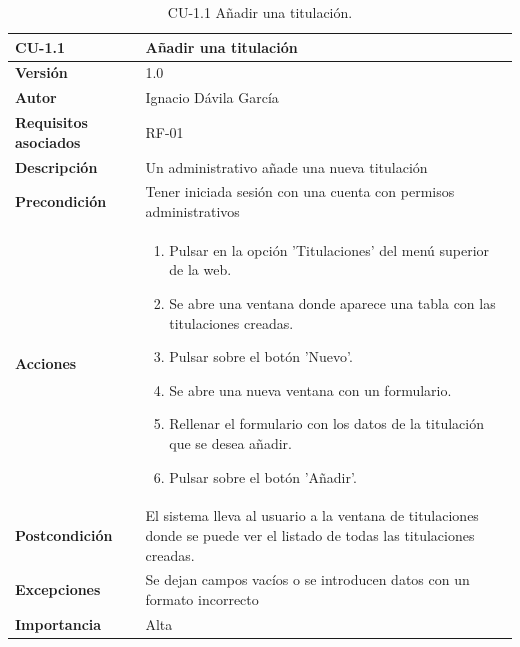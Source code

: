 \begin{table}[p]
	\centering
	\begin{tabularx}{\linewidth}{ p{} p{} }
		\toprule
		\textbf{CU-1.1}    & \textbf{Añadir una titulación}\\
		\toprule
		\textbf{Versión}              & 1.0    \\
		\textbf{Autor}                & Ignacio Dávila García \\
		\textbf{Requisitos asociados} & RF-01 \\
		\textbf{Descripción}          & Un administrativo añade una nueva titulación \\
		\textbf{Precondición}         & Tener iniciada sesión con una cuenta con permisos administrativos \\
		\textbf{Acciones}             &
		\begin{enumerate}
			\def\labelenumi{\arabic{enumi}.}
			\tightlist
			\item Pulsar en la opción 'Titulaciones' del menú superior de la web.
			\item Se abre una ventana donde aparece una tabla con las titulaciones creadas.
			\item Pulsar sobre el botón 'Nuevo'.
			\item Se abre una nueva ventana con un formulario.
			\item Rellenar el formulario con los datos de la titulación que se desea añadir.
			\item Pulsar sobre el botón 'Añadir'.
		\end{enumerate}\\
		\textbf{Postcondición}        & El sistema lleva al usuario a la ventana de titulaciones donde se puede ver el listado de todas las titulaciones creadas. \\
		\textbf{Excepciones}          & Se dejan campos vacíos o se introducen datos con un formato incorrecto \\
		\textbf{Importancia}          & Alta \\
		\bottomrule
	\end{tabularx}
	\caption{CU-1.1 Añadir una titulación.}
\end{table}

